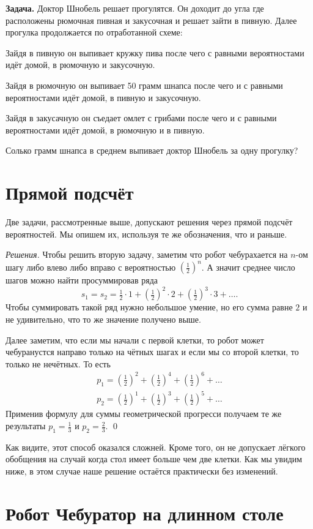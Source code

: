 \documentclass{article}
\begin{document}
\medskip
\noindent\textbf{Задача.}
Доктор Шнобель решает прогулятся.
Он доходит до угла где расположены рюмочная пивная и закусочная
и решает зайти в пивную.
Далее прогулка продолжается по отработанной схеме:

Зайдя в пивную он выпивает кружку пива 
после чего с равными вероятностами
идёт домой, в рюмочную и закусочную.

Зайдя в рюмочную он выпивает 50 грамм шнапса 
после чего и с равными вероятностами
идёт домой, в пивную и закусочную.

Зайдя в закусачную он съедает омлет с грибами
после чего и с равными вероятностами
идёт домой, в рюмочную и в пивную.

Солько грамм шнапса в среднем выпивает доктор Шнобель за  одну прогулку? 

\section{Прямой подсчёт}

Две задачи, рассмотренные выше, допускают решения через прямой подсчёт вероятностей. 
Мы опишем их, используя те же обозначения, что и раньше.

\medskip
\noindent\textit{Решения.}
Чтобы решить вторую задачу, 
заметим что робот чебурахается на $n$-ом шагу либо влево либо вправо с вероятностью $(\tfrac12)^n$.
А значит среднее число шагов можно найти просуммировав ряда
\[s_1=s_2=\tfrac12\cdot1+(\tfrac12)^2\cdot 2+(\tfrac12)^3\cdot 3+\dots.\]
Чтобы суммировать такой ряд нужно небольшое умение, 
но его сумма равне $2$ и не удивительно, что то же значение получено выше.

Далее заметим, что если мы начали с первой клетки, 
то робот может чебуранустся направо только на чётных шагах 
и если мы со второй клетки, 
то только не нечётных.
То есть
\begin{align*}
p_1=(\tfrac12)^2+(\tfrac12)^4+(\tfrac12)^6+\dots
\\
p_2=(\tfrac12)^1+(\tfrac12)^3+(\tfrac12)^5+\dots
\end{align*}
Применив формулу для суммы геометрической прогресси получаем те же результаты $p_1=\tfrac13$ и $p_2=\tfrac23$.
\qed
\medskip

Как видите, этот способ оказался сложней.
Кроме того, он не допускает лёгкого обобщения на случай когда стол имеет больше чем две клетки.
Как мы увидим ниже, 
в этом случае наше решение остаётся практически без изменений.


\section{Робот Чебуратор на длинном столе} 
\end{document}
